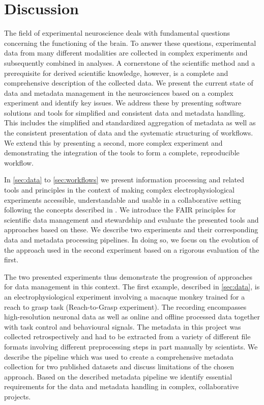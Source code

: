 \clearpage
\chapter{Discussion}
\label{sec:discussion}

The field of experimental neuroscience deals with fundamental questions concerning the functioning of the brain. To answer these questions, experimental data from many different modalities are collected in complex experiments and subsequently combined in analyses. A cornerstone of the scientific method and a prerequisite for derived scientific knowledge, however, is a complete and comprehensive description of the collected data. We present the current state of data and metadata management in the neurosciences based on a complex experiment and identify key issues. We address these by presenting software solutions and tools for simplified and consistent data and metadata handling. This includes the simplified and standardized aggregation of metadata as well as the consistent presentation of data and the systematic structuring of workflows. We extend this by presenting a second, more complex experiment and demonstrating the integration of the tools to form a complete, reproducible workflow.

In \cref{sec:data} to \cref{sec:workflows} we present information processing and related tools and principles in the context of making complex electrophysiological experiments accessible, understandable and usable in a collaborative setting following the concepts described in \citet{Zehl_2016, Zehl_2018}. We introduce the FAIR principles for scientific data management and stewardship and evaluate the presented tools and approaches based on these. We describe two experiments and their corresponding data and metadata processing pipelines. In doing so, we focus on the evolution of the approach used in the second experiment based on a rigorous evaluation of the first.

The two presented experiments thus demonstrate the progression of approaches for data management in this context. The first example, described in \cref{sec:data}, is an electrophysiological experiment involving a macaque monkey trained for a reach to grasp task (Reach-to-Grasp experiment). The recording encompasses high-resolution neuronal data as well as online and offline processed data together with task control and behavioural signals. The metadata in this project was collected retrospectively and had to be extracted from a variety of different file formats involving different preprocessing steps in part manually by scientists. We describe the pipeline which was used to create a comprehensive metadata collection for two published datasets and discuss limitations of the chosen approach. Based on the described metadata pipeline we identify essential requirements for the data and metadata handling in complex, collaborative projects.

